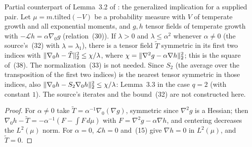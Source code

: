 \begin{lemma}
  \label{lem:bkl-near-symmetric-gradient}
  \leanok
  Partial counterpart of Lemma~3.2 of \cite{BizeulKlartagLehec2026}: the generalized implication for a
  supplied pair.  Let $\mu=m.\mathrm{tilted}(-V)$ be a probability measure with $V$ of temperate growth
  and all exponential moments, and $g,h$ tensor fields of temperate growth with
  $-\mathcal Lh=\alpha\nabla_0g$ (relation~(30)).  If $\lambda>0$ and $\lambda\le\alpha^2$ whenever
  $\alpha\ne0$ (the source's~(32) with $\lambda=\lambda_1$), there is a tensor field $\tilde T$ symmetric in
  its first two indices with $\lVert\nabla_0h-\tilde T\rVert_2^2\le\chi/\lambda$, where
  $\chi=\lVert\nabla^2g-\alpha\nabla h\rVert_2^2$; this is the square of~(38).  The normalization~(33) is not
  needed.  Since $S_2$ (the average over the transposition of the first two indices) is the nearest
  tensor symmetric in those indices, also $\lVert\nabla_0h-S_2\nabla_0h\rVert_2^2\le\chi/\lambda$: Lemma~3.3 in the
  case $q=2$ (with constant $1$).  The source's iterates and the bound~(32) are not constructed here.
\end{lemma}
\begin{proof}
  \leanok
  For $\alpha\ne0$ take $\tilde T=\alpha^{-1}\nabla_0(\nabla g)$, symmetric since $\nabla^2g$ is a Hessian;
  then $\nabla_0h-\tilde T=-\alpha^{-1}(F-\int F\,d\mu)$ with $F=\nabla^2g-\alpha\nabla h$, and centering
  decreases the $L^2(\mu)$ norm.  For $\alpha=0$, $\mathcal Lh=0$ and~(15) give $\nabla h=0$ in $L^2(\mu)$, and
  $\tilde T=0$.
\end{proof}

